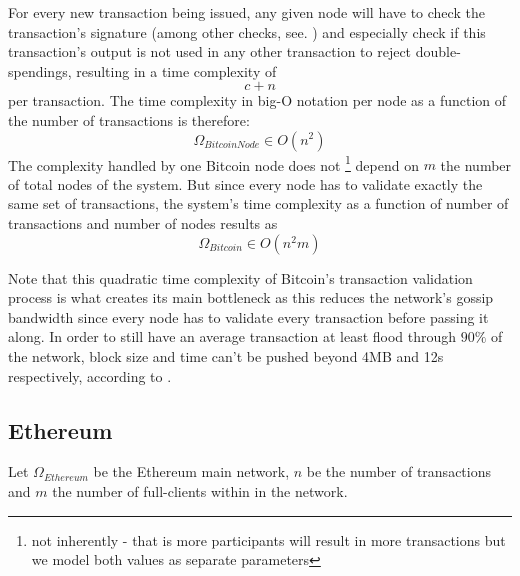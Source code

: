 \documentclass[twocolumn,showpacs,%
  nofootinbib,aps,superscriptaddress,%
  eqsecnum,prd,notitlepage,showkeys,10pt]{revtex4-1}
\begin{document}
For every new transaction being issued, any given node will have to check the transaction's signature (among other checks, see. \cite{bitcoin-protocol}) and especially check if this transaction's output is not used in any other transaction to reject double-spendings, resulting in a time complexity of
\begin{equation}
c+n
\end{equation}
per transaction. The time complexity in big-O notation per node as a function of the number of transactions is therefore:
\begin{equation}
\Omega_{BitcoinNode}\in O(n^2)
\end{equation}
The complexity handled by one Bitcoin node does not \footnote{not inherently - that is more participants will result in more transactions but we model both values as separate parameters} depend on $m$ the number of total nodes of the system. But since every node has to validate exactly the same set of transactions, the system's time complexity as a function of number of transactions and number of nodes results as
\begin{equation}
\Omega_{Bitcoin}\in O(n^2m)
\end{equation}

Note that this quadratic time complexity of Bitcoin's transaction validation process is what creates its main bottleneck as this reduces the network's gossip bandwidth since every node has to validate every transaction before passing it along. In order to still have an average transaction at least flood through $90\%$ of the network, block size and time can't be pushed beyond 4MB and 12s respectively, according to \cite{scaling}.

\subsection{Ethereum}
Let $\Omega_{Ethereum}$ be the Ethereum main network, $n$ be the number of transactions and $m$ the number of full-clients within in the network.
\end{document}
